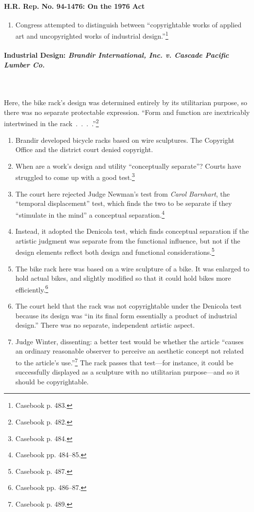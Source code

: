 \paragraph{H.R. Rep. No. 94-1476: On the 1976 Act}

\begin{enumerate}
    \item Congress attempted to distinguish between ``copyrightable works of 
    applied art and uncopyrighted works of industrial 
    design.''\footnote{Casebook p. 483.}
\end{enumerate}

\paragraph{Industrial Design: \emph{Brandir International, Inc. v. Cascade 
Pacific Lumber Co.}}
~\\\\
Here, the bike rack's design was determined entirely by its utilitarian 
purpose, so there was no separate protectable expression. ``Form and function 
are inextricably intertwined in the rack~.~.~.~.''\footnote{Casebook p. 482.}

\begin{enumerate}
    \item Brandir developed bicycle racks based on wire sculptures. The 
    Copyright Office and the district court denied copyright.
    \item When are a work's design and utility ``conceptually separate''? 
    Courts have struggled to come up with a good test.\footnote{Casebook p. 
    484.}
    \item The court here rejected Judge Newman's test from \emph{Carol 
    Barnhart}, the ``temporal displacement'' test, which finds the two to be 
    separate if they ``stimulate in the mind'' a conceptual 
    separation.\footnote{Casebook pp. 484--85.}
    \item Instead, it adopted the Denicola test, which finds conceptual 
    separation if the artistic judgment was separate from the functional 
    influence, but not if the design elements reflect both design and 
    functional considerations.\footnote{Casebook p. 487.}
    \item The bike rack here was based on a wire sculpture of a bike. It was 
    enlarged to hold actual bikes, and slightly modified so that it could hold 
    bikes more efficiently.\footnote{Casebook pp. 486--87.}
    \item The court held that the rack was not copyrightable under the 
    Denicola test because its design was ``in its final form essentially a 
    product of industrial design.'' There was no separate, independent 
    artistic aspect.
    \item Judge Winter, dissenting: a better test would be whether the article 
    ``causes an ordinary reasonable observer to perceive an aesthetic concept 
    not related to the article's use.''\footnote{Casebook p. 489.} The rack 
    passes that test---for instance, it could be successfully displayed as a 
    sculpture with no utilitarian purpose---and so it should be copyrightable.
\end{enumerate}

